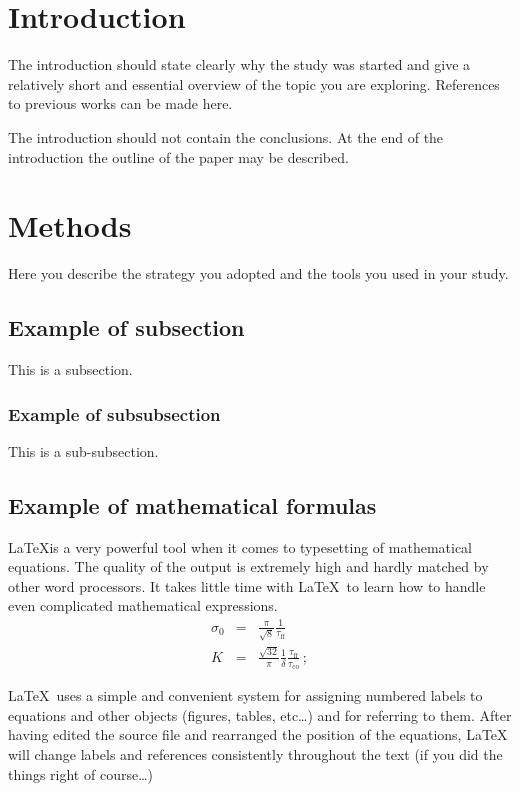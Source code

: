 \documentclass[a4paper,10pt]{article}
\begin{document}
\section{Introduction}
The introduction should state clearly why the study was started
and give a relatively short and essential overview of the topic
you are exploring. References to previous works can be made here.
 
The introduction should not contain the conclusions. 
At the end of the introduction the outline of the paper may be described.
 
 
\section{Methods}
Here you describe the strategy you adopted and the tools you
used in your study.
\subsection{Example of subsection}
This is a subsection.
\subsubsection{Example of subsubsection}
This is a sub-subsection.

\subsection{Example of mathematical formulas}
\LaTeX is a very powerful tool when it comes to typesetting of
mathematical equations. The quality of the output is extremely
high and hardly matched by other word processors. It takes little
time with {\LaTeX\,}  to learn how to handle 
even complicated mathematical expressions.
   \begin{eqnarray}
      \sigma_0 & = & \frac{\pi}{\sqrt{8}}
                     \frac{1}{ \tau_{\mathrm{ff}}} \\
      K        & = & \frac{\sqrt{32}}{\pi} \frac{1}{\delta}
                        \frac{ \tau_{\mathrm{ff}} }
                             { \tau_{\mathrm{co}} }\,;
   \end{eqnarray}

\LaTeX\, uses a simple and convenient system for assigning numbered labels
to equations and other objects (figures, tables, etc\ldots) and for referring
to them. After having edited the source file and rearranged the position of
the equations, \LaTeX\, will  change labels and references
consistently throughout the text (if you did the things right of
course\ldots) 
 
\end{document}

